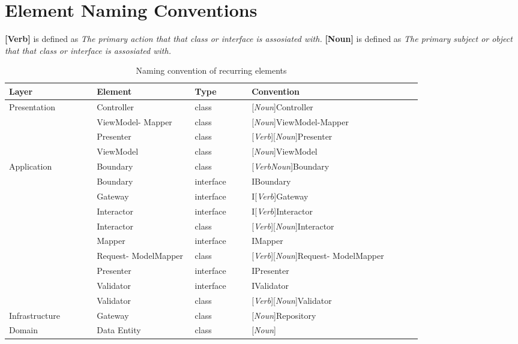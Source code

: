 \section{Element Naming Conventions} \label{appendix_element_naming_convention}

\textbf{[Verb]} is defined as \textit{The primary action that that class or interface is assosiated with.} \newline 
\textbf{[Noun]} is defined as \textit{The primary subject or object that that class or interface is assosiated with.} 

\begin{table}[ht]
  \renewcommand{\arraystretch}{1.5}
  \footnotesize
  \caption{Naming convention of recurring elements}
  \begin{tabular}{ p{0.17\linewidth}  p{0.19\linewidth}  p{0.11\linewidth}  p{0.33\linewidth} }
  \hline
  \textbf{Layer} & \textbf{Element} & \textbf{Type} & \textbf{Convention} \\ \hline
  Presentation & Controller & class & [\textit{Noun}]Controller \\
  & ViewModel- Mapper & class & [\textit{Noun}]ViewModel-Mapper \\
  & Presenter & class & [\textit{Verb}][\textit{Noun}]Presenter \\
  & ViewModel & class & [\textit{Noun}]ViewModel \\

  Application & Boundary & class & [\textit{VerbNoun}]Boundary \\
  & Boundary  & interface & IBoundary \\
  & Gateway  & interface & I[\textit{Verb}]Gateway \\
  & Interactor  & interface & I[\textit{Verb}]Interactor \\
  & Interactor & class & [\textit{Verb}][\textit{Noun}]Interactor \\
  & Mapper  & interface & IMapper \\
  & Request- ModelMapper & class & [\textit{Verb}][\textit{Noun}]Request- ModelMapper \\
  & Presenter  & interface & IPresenter \\
  & Validator  & interface & IValidator \\
  & Validator & class & [\textit{Verb}][\textit{Noun}]Validator \\
  
  Infrastructure & Gateway & class & [\textit{Noun}]Repository \\

  Domain & Data Entity & class & [\textit{Noun}] \\ \hline

  \end{tabular}
  
  \label{table_element_naming_convention}
\end{table}
